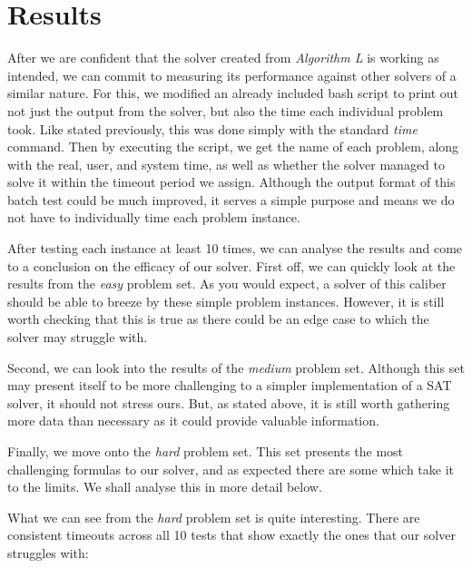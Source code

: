 \documentclass{article}
\begin{document}
\section{Results}
After we are confident that the solver created from \textit{Algorithm L} is working as intended, we can commit to measuring its
performance against other solvers of a similar nature. For this, we modified an already included bash script to print out not just
the output from the solver, but also the time each individual problem took. Like stated previously, this was done simply with the
standard \textit{time} command. Then by executing the script, we get the name of each problem, along with the real, user, and
system time, as well as whether the solver managed to solve it within the timeout period we assign. Although the output format of
this batch test could be much improved, it serves a simple purpose and means we do not have to individually time each problem
instance.

After testing each instance at least 10 times, we can analyse the results and come to a conclusion on the efficacy of our solver.
First off, we can quickly look at the results from the \textit{easy} problem set. As you would expect, a solver of this caliber
should be able to breeze by these simple problem instances. However, it is still worth checking that this is true as there could
be an edge case to which the solver may struggle with.


Second, we can look into the results of the \textit{medium} problem set. Although this set may present itself to be more
challenging to a simpler implementation of a SAT solver, it should not stress ours. But, as stated above, it is still worth
gathering more data than necessary as it could provide valuable information. 


Finally, we move onto the \textit{hard} problem set. This set presents the most challenging formulas to our solver, and as
expected there are some which take it to the limits. We shall analyse this in more detail below.


What we can see from the \textit{hard} problem set is quite interesting. There are consistent timeouts across all 10 tests that
show exactly the ones that our solver struggles with:
\end{document}
